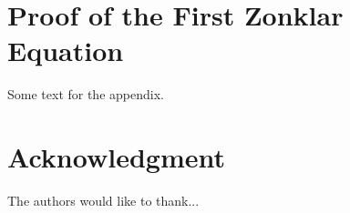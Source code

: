 \documentclass[journal]{IEEEtran}
\begin{document}
\appendices
\section{Proof of the First Zonklar Equation}
Some text for the appendix.

\section*{Acknowledgment}


The authors would like to thank...


\ifCLASSOPTIONcaptionsoff
  \newpage
\fi







%



%
\end{document}
